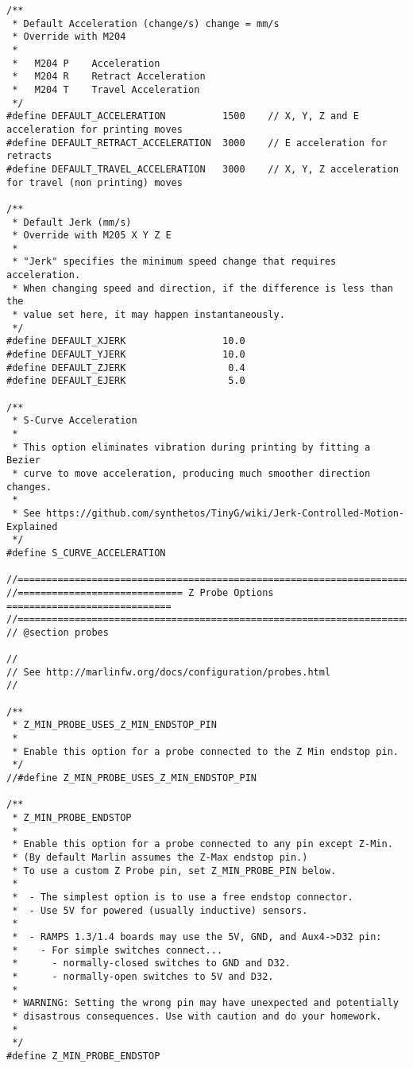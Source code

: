 \begin{lstlisting}[caption = キャプション, label = ラベル]
/**
 * Default Acceleration (change/s) change = mm/s
 * Override with M204
 *
 *   M204 P    Acceleration
 *   M204 R    Retract Acceleration
 *   M204 T    Travel Acceleration
 */
#define DEFAULT_ACCELERATION          1500    // X, Y, Z and E acceleration for printing moves
#define DEFAULT_RETRACT_ACCELERATION  3000    // E acceleration for retracts
#define DEFAULT_TRAVEL_ACCELERATION   3000    // X, Y, Z acceleration for travel (non printing) moves

/**
 * Default Jerk (mm/s)
 * Override with M205 X Y Z E
 *
 * "Jerk" specifies the minimum speed change that requires acceleration.
 * When changing speed and direction, if the difference is less than the
 * value set here, it may happen instantaneously.
 */
#define DEFAULT_XJERK                 10.0
#define DEFAULT_YJERK                 10.0
#define DEFAULT_ZJERK                  0.4
#define DEFAULT_EJERK                  5.0

/**
 * S-Curve Acceleration
 *
 * This option eliminates vibration during printing by fitting a Bezier
 * curve to move acceleration, producing much smoother direction changes.
 *
 * See https://github.com/synthetos/TinyG/wiki/Jerk-Controlled-Motion-Explained
 */
#define S_CURVE_ACCELERATION

//===========================================================================
//============================= Z Probe Options =============================
//===========================================================================
// @section probes

//
// See http://marlinfw.org/docs/configuration/probes.html
//

/**
 * Z_MIN_PROBE_USES_Z_MIN_ENDSTOP_PIN
 *
 * Enable this option for a probe connected to the Z Min endstop pin.
 */
//#define Z_MIN_PROBE_USES_Z_MIN_ENDSTOP_PIN

/**
 * Z_MIN_PROBE_ENDSTOP
 *
 * Enable this option for a probe connected to any pin except Z-Min.
 * (By default Marlin assumes the Z-Max endstop pin.)
 * To use a custom Z Probe pin, set Z_MIN_PROBE_PIN below.
 *
 *  - The simplest option is to use a free endstop connector.
 *  - Use 5V for powered (usually inductive) sensors.
 *
 *  - RAMPS 1.3/1.4 boards may use the 5V, GND, and Aux4->D32 pin:
 *    - For simple switches connect...
 *      - normally-closed switches to GND and D32.
 *      - normally-open switches to 5V and D32.
 *
 * WARNING: Setting the wrong pin may have unexpected and potentially
 * disastrous consequences. Use with caution and do your homework.
 *
 */
#define Z_MIN_PROBE_ENDSTOP


\end{lstlisting}
